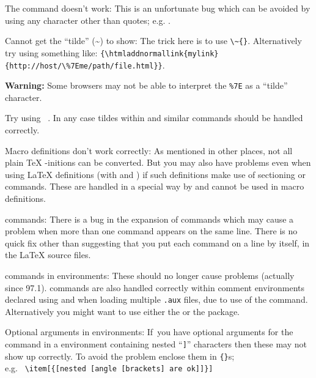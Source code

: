 \begin{htmllist}
\item [The \Lc{verb"ABC"} command doesn't work: ]
This is an unfortunate bug which can be avoided by using 
any character other than quotes; e.g. .

\item [Cannot get the ``tilde'' (\~{}) to show: \hfill]
The trick here is to use \verb|\~{}|.\html{\\}
Alternatively try using something like:
\verb|{\htmladdnormallink{mylink}{http://host/\%7Eme/path/file.html}}|. 

\textbf{Warning:} Some browsers may not be able to interpret the \verb|%7E|
as a ``tilde'' character.

Try using ~.
In any case tildes within  and similar commands
should be handled correctly.

\item [Macro definitions don't work correctly: ]
As mentioned in other places, not all plain \TeX{} -initions 
can be converted.
But you may also have problems even when using \LaTeX{} definitions
(with  and ) if such definitions
make use of sectioning or  commands. These are 
handled in a special way by \latextohtml{} and cannot be used in
macro definitions. 


\item [\Lc{input} commands: ]
There is a bug in the expansion of  commands which may cause
a problem when more than one  command appears on the same line.
There is no quick fix other than suggesting that you put each
 command on a line by itself, in the \LaTeX{} source files.

\item [\Lc{input} commands in \env{verbatim} environments: ]
These should no longer cause problems (actually since 97.1).
 commands are also handled correctly within comment environments
declared using  
and when loading multiple \texttt{.aux} files, 
due to use of the  command.
Alternatively you might want to use
either the  or the  package.

\item [Optional arguments in \env{description} environments: ]
If~you have optional arguments for the  command in 
a  environment containing nested ``\texttt{]}'' characters then 
these may not show up correctly. To avoid the problem enclose them
in \verb|{}|s;\\ e.g. \ \verb+\item[{[nested [angle [brackets] are ok]]}]+



\end{htmllist}
